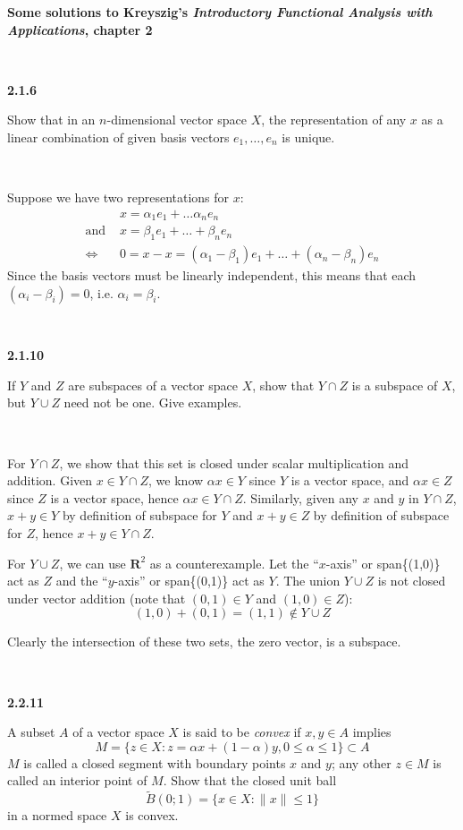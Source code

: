 \documentclass{article}
\newcommand{\R}{\textbf{R}}
\begin{document}
\textbf{Some solutions to Kreyszig's
  \textit{Introductory Functional Analysis with Applications}, chapter 2
}

\

\textbf{2.1.6}

Show that in an $n$-dimensional vector space $X$,
the representation of any $x$ as a linear combination of given basis
vectors $e_1, \dots, e_n$ is unique.

\

Suppose we have two representations for $x$:
\begin{align*}
  & x = \alpha_1e_1 + \dots \alpha_n e_n \\
  \text{and } & x = \beta_1e_1 + \dots + \beta_n e_n \\
\iff & 0 = x-x = (\alpha_1-\beta_1)e_1 + \dots + (\alpha_n-\beta_n) e_n 
\end{align*}
Since the basis vectors must be linearly independent,
this means that each $(\alpha_i-\beta_i) = 0$,
i.e. $\alpha_i = \beta_i$.

\

\textbf{2.1.10}

If $Y$ and $Z$ are subspaces of a vector space $X$,
show that $Y \cap Z$ is a subspace of $X$,
but $Y \cup Z$ need not be one. 
Give examples. 

\

For $Y \cap Z$,
we show that this set is closed under scalar multiplication and addition. 
Given $x \in Y\cap Z$,
we know $\alpha x \in Y$ since $Y$ is a vector space,
and $\alpha x \in Z$ since $Z$ is a vector space,
hence $\alpha x \in Y \cap Z$. 
Similarly, 
given any $x$ and $y$ in $Y \cap Z$,
$x+y \in Y$ by definition of subspace for $Y$ and
$x+y \in Z$ by definition of subspace for $Z$,
hence $x+y \in Y \cap Z$. 

For $Y \cup Z$,
we can use $\R^2$ as a counterexample.
Let the ``$x$-axis'' or span\{(1,0)\} act as $Z$ and the
``$y$-axis'' or span\{(0,1)\} act as $Y$.
The union $Y \cup Z$ is not closed under vector addition
(note that $(0,1) \in Y$ and $(1,0) \in Z$): 
$$(1,0) + (0,1) = (1,1) \notin Y \cup Z$$

Clearly the intersection of these two sets, the zero vector, is a subspace. 

\

\textbf{2.2.11}

A subset $A$ of a vector space $X$ is said to be \textit{convex}
if $x,y \in A$ implies
$$ M = \{z \in X : z = \alpha x + (1-\alpha) y, 0 \leq \alpha \leq 1 \} \subset A$$
$M$ is called a closed segment with boundary points $x$ and $y$;
any other $z\in M$ is called an interior point of $M$.
Show that the closed unit ball
$$ \tilde{B}(0;1) = \{x\in X : \lVert x \rVert \leq 1 \}$$
in a normed space $X$ is convex. 
\end{document}
